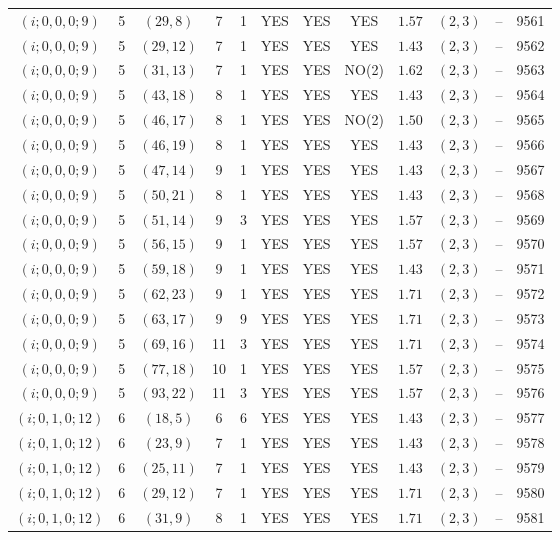 \begin{longtable}{|c|c|c|c|c|c|c|c|c|c|c|c|}
$(i;0,0,0;9)$ & 5 & $(29,8)$ & 7 & 1 & YES & YES & YES & $1.57$ & $(2,3)$ & -- & 9561\\
$(i;0,0,0;9)$ & 5 & $(29,12)$ & 7 & 1 & YES & YES & YES & $1.43$ & $(2,3)$ & -- & 9562\\
$(i;0,0,0;9)$ & 5 & $(31,13)$ & 7 & 1 & YES & YES & NO(2) & $1.62$ & $(2,3)$ & -- & 9563\\
$(i;0,0,0;9)$ & 5 & $(43,18)$ & 8 & 1 & YES & YES & YES & $1.43$ & $(2,3)$ & -- & 9564\\
$(i;0,0,0;9)$ & 5 & $(46,17)$ & 8 & 1 & YES & YES & NO(2) & $1.50$ & $(2,3)$ & -- & 9565\\
$(i;0,0,0;9)$ & 5 & $(46,19)$ & 8 & 1 & YES & YES & YES & $1.43$ & $(2,3)$ & -- & 9566\\
$(i;0,0,0;9)$ & 5 & $(47,14)$ & 9 & 1 & YES & YES & YES & $1.43$ & $(2,3)$ & -- & 9567\\
$(i;0,0,0;9)$ & 5 & $(50,21)$ & 8 & 1 & YES & YES & YES & $1.43$ & $(2,3)$ & -- & 9568\\
$(i;0,0,0;9)$ & 5 & $(51,14)$ & 9 & 3 & YES & YES & YES & $1.57$ & $(2,3)$ & -- & 9569\\
$(i;0,0,0;9)$ & 5 & $(56,15)$ & 9 & 1 & YES & YES & YES & $1.57$ & $(2,3)$ & -- & 9570\\
$(i;0,0,0;9)$ & 5 & $(59,18)$ & 9 & 1 & YES & YES & YES & $1.43$ & $(2,3)$ & -- & 9571\\
$(i;0,0,0;9)$ & 5 & $(62,23)$ & 9 & 1 & YES & YES & YES & $1.71$ & $(2,3)$ & -- & 9572\\
$(i;0,0,0;9)$ & 5 & $(63,17)$ & 9 & 9 & YES & YES & YES & $1.71$ & $(2,3)$ & -- & 9573\\
$(i;0,0,0;9)$ & 5 & $(69,16)$ & 11 & 3 & YES & YES & YES & $1.71$ & $(2,3)$ & -- & 9574\\
$(i;0,0,0;9)$ & 5 & $(77,18)$ & 10 & 1 & YES & YES & YES & $1.57$ & $(2,3)$ & -- & 9575\\
$(i;0,0,0;9)$ & 5 & $(93,22)$ & 11 & 3 & YES & YES & YES & $1.57$ & $(2,3)$ & -- & 9576\\
$(i;0,1,0;12)$ & 6 & $(18,5)$ & 6 & 6 & YES & YES & YES & $1.43$ & $(2,3)$ & -- & 9577\\
$(i;0,1,0;12)$ & 6 & $(23,9)$ & 7 & 1 & YES & YES & YES & $1.43$ & $(2,3)$ & -- & 9578\\
$(i;0,1,0;12)$ & 6 & $(25,11)$ & 7 & 1 & YES & YES & YES & $1.43$ & $(2,3)$ & -- & 9579\\
$(i;0,1,0;12)$ & 6 & $(29,12)$ & 7 & 1 & YES & YES & YES & $1.71$ & $(2,3)$ & -- & 9580\\
$(i;0,1,0;12)$ & 6 & $(31,9)$ & 8 & 1 & YES & YES & YES & $1.71$ & $(2,3)$ & -- & 9581\\

\end{longtable}
